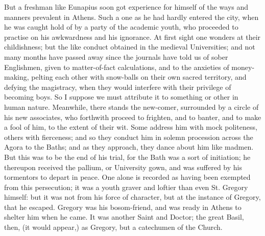 But a freshman like Eunapius soon got experience for himself of the
ways and manners prevalent in Athens. Such a one as he had hardly
entered the city, when he was caught hold of by a party of the
academic youth, who proceeded to practise on his awkwardness and his
ignorance. At first sight one wonders at their childishness; but the
like conduct obtained in the medieval Universities; and not many
months have passed away since the journals have told us of sober
Englishmen, given to matter-of-fact calculations, and to the anxieties
of money-making, pelting each other with snow-balls on their own
sacred territory, and defying the magistracy, when they would
interfere with their privilege of becoming boys. So I suppose we must
attribute it to something or other in human nature. Meanwhile, there
stands the new-comer, surrounded by a circle of his new associates,
who forthwith proceed to frighten, and to banter, and to make a fool
of him, to the extent of their wit. Some address him with mock
politeness, others with fierceness; and so they conduct him in solemn
procession across the Agora to the Baths; and as they approach, they
dance about him like madmen. But this was to be the end of his trial,
for the Bath was a sort of initiation; he thereupon received the
pallium, or University gown, and was suffered by his tormentors to
depart in peace. One alone is recorded as having been exempted from
this persecution; it was a youth graver and loftier than even St.
Gregory himself: but it was not from his force of character, but at
the instance of Gregory, that he escaped. Gregory was his
bosom-friend, and was ready in Athens to shelter him when he came. It
was another Saint and Doctor; the great Basil, then, (it would
appear,) as Gregory, but a catechumen of the Church.

